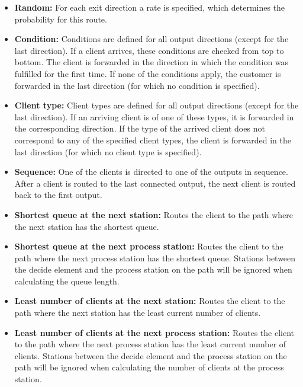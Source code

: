 \begin{itemize}
  \item 
    \textbf{Random:}
    For each exit direction a rate is specified, which determines the probability for this route.

  \item 
    \textbf{Condition:}
    Conditions are defined for all output directions (except for the last direction).
    If a client arrives, these conditions are checked from top to bottom.
    The client is forwarded in the direction in which the condition was fulfilled for the first time.
    If none of the conditions apply, the customer is forwarded in the last direction
    (for which no condition is specified).

  \item 
    \textbf{Client type:}
    Client types are defined for all output directions (except for the last direction).
    If an arriving client is of one of these types, it is forwarded in the corresponding direction.
    If the type of the arrived client does not correspond to any of the specified client types,
    the client is forwarded in the last direction (for which no client type is specified).

  \item 
    \textbf{Sequence:}
    One of the clients is directed to one of the outputs in sequence. After a client is routed to the last
    connected output, the next client is routed back to the first output.

  \item 
    \textbf{Shortest queue at the next station:}
    Routes the client to the path where the next station
    has the shortest queue.

  \item 
    \textbf{Shortest queue at the next process station:}
    Routes the client to the path where the next process station
    has the shortest queue. Stations between the decide element
    and the process station on the path will be ignored when
    calculating the queue length.

  \item  
    \textbf{Least number of clients at the next station:}
    Routes the client to the path where the next station
    has the least current number of clients.    

  \item 
    \textbf{Least number of clients at the next process station:}
    Routes the client to the path where the next process station
    has the least current number of clients. Stations between the decide element
    and the process station on the path will be ignored when
    calculating the number of clients at the process station.    


\end{itemize}
